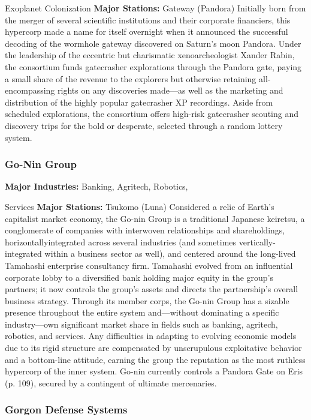 Exoplanet Colonization
\textbf{Major Stations:} Gateway (Pandora)
Initially born from the merger of several scientific 
institutions and their corporate financiers, this hypercorp made a name for itself overnight when it 
announced the successful decoding of the wormhole 
gateway discovered on Saturn's moon Pandora. Under 
the leadership of the eccentric but charismatic xenoarcheologist Xander Rabin, the consortium funds 
gatecrasher explorations through the Pandora gate, 
paying a small share of the revenue to the explorers 
but otherwise retaining all-encompassing rights on 
any discoveries made—as well as the marketing and 
distribution of the highly popular gatecrasher XP 
recordings. Aside from scheduled explorations, the 
consortium offers high-risk gatecrasher scouting and 
discovery trips for the bold or desperate, selected 
through a random lottery system.

\subsubsection{Go-Nin Group}

\textbf{Major Industries:} Banking, Agritech, Robotics, 

Services
\textbf{Major Stations:} Tsukomo (Luna)
Considered a relic of Earth's capitalist market 
economy, the Go-nin Group is a traditional Japanese 
keiretsu, a conglomerate of companies with interwoven relationships and shareholdings, horizontallyintegrated across several industries (and sometimes 
vertically-integrated within a business sector as well), 
and centered around the long-lived Tamahashi enterprise consultancy firm. Tamahashi evolved from 
an influential corporate lobby to a diversified  bank 
holding major equity in the group's partners; it now 
controls the group's assets and directs the partnership's 
overall business strategy. Through its member corps, 
the Go-nin Group has a sizable presence throughout 
the entire system and—without dominating a specific 
industry—own significant market share in fields such 
as banking, agritech, robotics, and services. Any difficulties in adapting to evolving economic models due 
to its rigid structure are compensated by unscrupulous 
exploitative behavior and a bottom-line attitude, 
earning the group the reputation as the most ruthless 
hypercorp of the inner system. Go-nin currently controls a Pandora Gate on Eris (p. 109), secured by a 
contingent of ultimate mercenaries.

\subsubsection{Gorgon Defense Systems}

